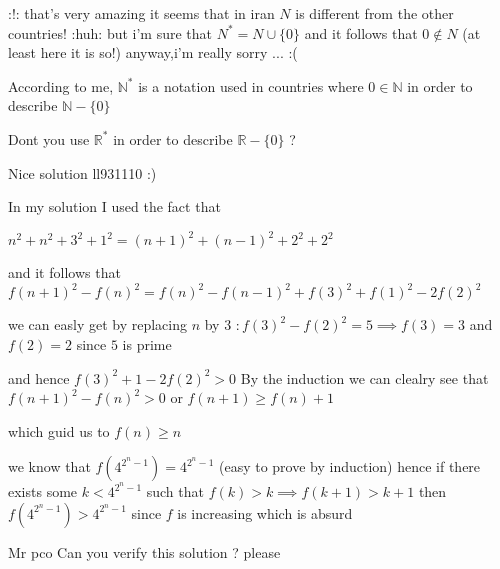 \begin{solution}
	\begin{tcolorbox}:!:   that's very amazing it seems that in iran $ N$ is different from the other countries! :huh: 
but i'm sure that $ N^* = N \cup \{0 \}$ and it follows that $ 0\not \in N$ (at least here it is so!)
anyway,i'm really sorry ... :(\end{tcolorbox}

According to me, $ \mathbb N^*$ is a notation used in countries where $ 0\in\mathbb N$ in order to describe $ \mathbb N - \{0\}$

Dont you use $ \mathbb R^*$ in order to describe $ \mathbb R-\{0\}$ ?
\end{solution}



\begin{solution}
	Nice solution ll931110   :) 

In my solution I used the fact that 

$ n^2 + n^2 + 3^2 + 1^2 = (n + 1)^2 + (n - 1)^2 + 2^2 + 2^2$

and it follows that $ f(n + 1)^2 - f(n)^2 = f(n)^2 - f(n - 1)^2 + f(3)^2 + f(1)^2 - 2f(2)^2$

we can easly get by replacing $ n$ by $ 3$ $ : f(3)^2 - f(2)^2 = 5 \implies f(3) = 3$ and $ f(2) = 2$ since $ 5$ is prime 

and hence $ f(3)^2 + 1 - 2f(2)^2 > 0$ By the induction we can clealry see that $ f(n + 1)^2 - f(n)^2 > 0$ or $ f(n + 1)\ge f(n) + 1$

which guid us to $ f(n) \ge n$

we know that $ f(4^{2^n - 1}) = 4^{2^n - 1}$ (easy to prove by induction) hence if there exists some $ k < 4^{2^n - 1}$ such that $ f(k) > k \implies f(k + 1) > k + 1$ then $ f(4^{2^n - 1}) > 4^{2^n - 1}$ since $ f$ is increasing which is absurd 

Mr pco Can you verify this solution ? please  
\end{solution}



